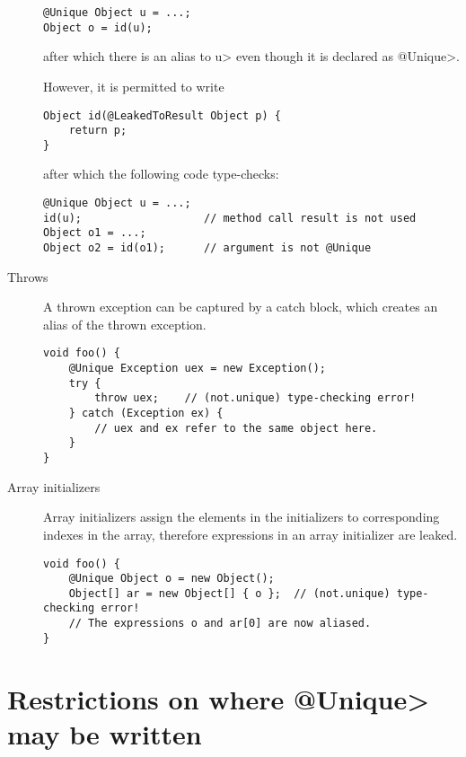 \begin{description}
\begin{Verbatim}
@Unique Object u = ...;
Object o = id(u);
\end{Verbatim}

\noindent
after which there is an alias to \<u> even though it is declared as \<@Unique>.

However, it is permitted to write

\begin{Verbatim}
Object id(@LeakedToResult Object p) {
    return p;
}
\end{Verbatim}

\noindent
after which the following code type-checks:

\begin{Verbatim}
@Unique Object u = ...;
id(u);                   // method call result is not used
Object o1 = ...;
Object o2 = id(o1);      // argument is not @Unique
\end{Verbatim}



\item[Throws]
A thrown exception can be captured by a catch block, which creates an
alias of the thrown exception.

\begin{Verbatim}
void foo() {
    @Unique Exception uex = new Exception();
    try {
        throw uex;    // (not.unique) type-checking error!
    } catch (Exception ex) {
        // uex and ex refer to the same object here.
    }
}
\end{Verbatim}

\item[Array initializers]

Array initializers assign the elements in the initializers to corresponding
indexes in the array, therefore expressions in an array initializer are leaked.

\begin{Verbatim}
void foo() {
    @Unique Object o = new Object();
    Object[] ar = new Object[] { o };  // (not.unique) type-checking error!
    // The expressions o and ar[0] are now aliased.
}
\end{Verbatim}


\end{description}


\section{Restrictions on where \<@Unique> may be written\label{aliasing-unique-restrictions}}

